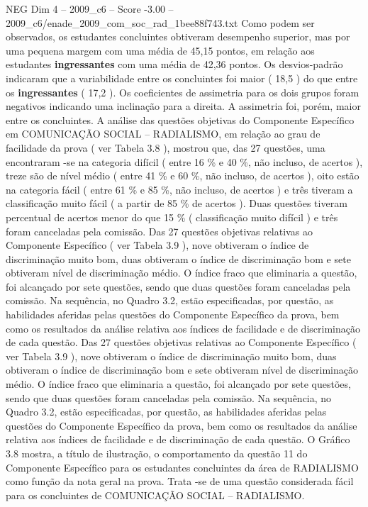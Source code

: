 \begin{textsample}{NEG Dim 4 – 2009\_c6 – Score -3.00 – 2009\_c6/enade\_2009\_com\_soc\_rad\_1bee88f743.txt}
Como podem ser observados, os estudantes concluintes obtiveram desempenho superior, mas por uma pequena margem com uma média de 45,15 pontos, em relação aos estudantes \textbf{ingressantes} com uma média de 42,36 pontos.
Os desvios-padrão indicaram que a variabilidade entre os concluintes foi maior ( 18,5 ) do que entre os \textbf{ingressantes} ( 17,2 ).
Os coeficientes de assimetria para os dois grupos foram negativos indicando uma inclinação para a direita.
A assimetria foi, porém, maior entre os concluintes.
A análise das questões objetivas do Componente Específico em COMUNICAÇÃO SOCIAL – RADIALISMO, em relação ao grau de facilidade da prova ( ver Tabela 3.8 ), mostrou que, das 27 questões, uma encontraram -se na categoria difícil ( entre 16 \% e 40 \%, não incluso, de acertos ), treze são de nível médio ( entre 41 \% e 60 \%, não incluso, de acertos ), oito estão na categoria fácil ( entre 61 \% e 85 \%, não incluso, de acertos ) e três tiveram a classificação muito fácil ( a partir de 85 \% de acertos ).
Duas questões tiveram percentual de acertos menor do que 15 \% ( classificação muito difícil ) e três foram canceladas pela comissão.
Das 27 questões objetivas relativas ao Componente Específico ( ver Tabela 3.9 ), nove obtiveram o índice de discriminação muito bom, duas obtiveram o índice de discriminação bom e sete obtiveram nível de discriminação médio.
O índice fraco que eliminaria a questão, foi alcançado por sete questões, sendo que duas questões foram canceladas pela comissão.
Na sequência, no Quadro 3.2, estão especificadas, por questão, as habilidades aferidas pelas questões do Componente Específico da prova, bem como os resultados da análise relativa aos índices de facilidade e de discriminação de cada questão.
Das 27 questões objetivas relativas ao Componente Específico ( ver Tabela 3.9 ), nove obtiveram o índice de discriminação muito bom, duas obtiveram o índice de discriminação bom e sete obtiveram nível de discriminação médio.
O índice fraco que eliminaria a questão, foi alcançado por sete questões, sendo que duas questões foram canceladas pela comissão.
Na sequência, no Quadro 3.2, estão especificadas, por questão, as habilidades aferidas pelas questões do Componente Específico da prova, bem como os resultados da análise relativa aos índices de facilidade e de discriminação de cada questão.
O Gráfico 3.8 mostra, a título de ilustração, o comportamento da questão 11 do Componente Específico para os estudantes concluintes da área de RADIALISMO como função da nota geral na prova.
Trata -se de uma questão considerada fácil para os concluintes de COMUNICAÇÃO SOCIAL – RADIALISMO.

\end{textsample}
